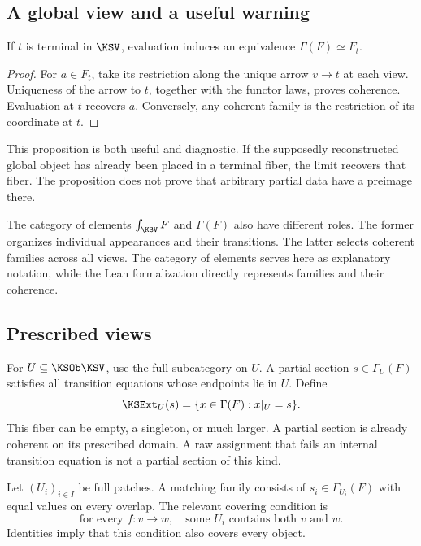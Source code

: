 \subsection{A global view and a useful warning}
\begin{KSproposition}\label{KS:KS03}
If \(t\) is terminal in \(\KSV\), evaluation induces an equivalence \(\Gamma(F)\simeq F_t\).
\end{KSproposition}
\begin{proof}
For \(a\in F_t\), take its restriction along the unique arrow \(v\to t\) at each view. Uniqueness of the arrow to \(t\), together with the functor laws, proves coherence. Evaluation at \(t\) recovers \(a\). Conversely, any coherent family is the restriction of its coordinate at \(t\).
\end{proof}
This proposition is both useful and diagnostic. If the supposedly reconstructed global object has already been placed in a terminal fiber, the limit recovers that fiber. The proposition does not prove that arbitrary partial data have a preimage there.

The category of elements \(\int_\KSV F\) and \(\Gamma(F)\) also have different roles. The former organizes individual appearances and their transitions. The latter selects coherent families across all views. The category of elements serves here as explanatory notation, while the Lean formalization directly represents families and their coherence.

\label{KS:sec:glue}
\subsection{Prescribed views}
For \(U\subseteq\KSOb\KSV\), use the full subcategory on \(U\). A partial section \(s\in\Gamma_U(F)\) satisfies all transition equations whose endpoints lie in \(U\). Define
\begin{equation}\label{KS:eq:extension}
 \KSExt_U(s)=\{x\in\Gamma(F):x|_U=s\}.
\end{equation}
This fiber can be empty, a singleton, or much larger. A partial section is already coherent on its prescribed domain. A raw assignment that fails an internal transition equation is not a partial section of this kind.

Let \((U_i)_{i\in I}\) be full patches. A matching family consists of \(s_i\in\Gamma_{U_i}(F)\) with equal values on every overlap. The relevant covering condition is
\begin{equation}\label{KS:eq:transitioncover}
 \text{for every }f:v\to w,\quad
 \text{some }U_i\text{ contains both }v\text{ and }w.
\end{equation}
Identities imply that this condition also covers every object.

